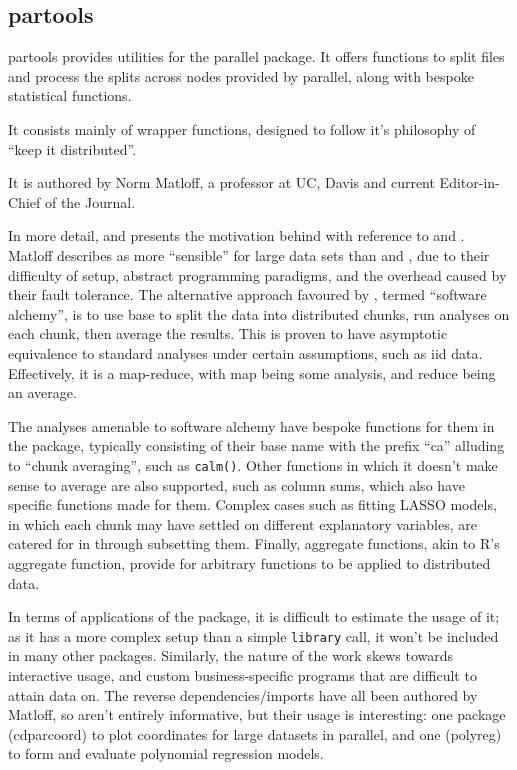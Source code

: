 \hypertarget{sec:partools}{%
    \subsection{partools}\label{sec:partools}}

partools provides utilities for the parallel
package\cite{matloff16softw_alchemy}. It offers functions to split
files and process the splits across nodes provided by parallel, along
with bespoke statistical functions.

It consists mainly of wrapper functions, designed to follow it's
philosophy of ``keep it distributed''.

It is authored by Norm Matloff, a professor at UC, Davis and current
Editor-in-Chief of the \R Journal.

In more detail, \cite{matloff15} and \cite{matloff17} presents the
motivation behind  with reference to  and . Matloff
describes  as more ``sensible'' for large data sets than 
and , due to their difficulty of setup, abstract programming
paradigms, and the overhead caused by their fault tolerance. The
alternative approach favoured by , termed ``software alchemy'',
is to use base \R to split the data into distributed chunks, run analyses
on each chunk, then average the results. This is proven to have
asymptotic equivalence to standard analyses under certain assumptions,
such as iid data. Effectively, it is a map-reduce, with map being some
analysis, and reduce being an average.

The analyses amenable to software alchemy have bespoke functions for
them in the package, typically consisting of their base \R name with the
prefix ``ca'' alluding to ``chunk averaging'', such as
\texttt{calm()}. Other functions in which it
doesn't make sense to average are also supported, such as column sums,
which also have specific functions made for them. Complex cases such as
fitting LASSO models, in which each chunk may have settled on different
explanatory variables, are catered for in  through subsetting
them. Finally, aggregate functions, akin to R's aggregate function,
provide for arbitrary functions to be applied to distributed data.

In terms of applications of the package, it is difficult to estimate the
usage of it; as it has a more complex setup than a simple
\texttt{library} call, it won't be included in many other packages.
Similarly, the nature of the work skews towards interactive usage, and
custom business-specific programs that are difficult to attain data on.
The reverse dependencies/imports have all been authored by Matloff, so
aren't entirely informative, but their usage is interesting: one package
(cdparcoord) to plot coordinates for large datasets in parallel, and one
(polyreg) to form and evaluate polynomial regression models.

